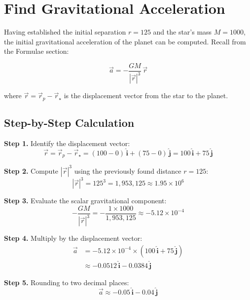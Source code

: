 \section{Find Gravitational Acceleration}

Having established the initial separation $r = 125$ and the star's mass $M = 1000$, the initial gravitational acceleration of the planet can be computed. Recall from the Formulae section:

\begin{equation}
\vec{a} = -\frac{GM}{|\vec{r}|^3}\,\vec{r}
\end{equation}

where $\vec{r} = \vec{r}_p - \vec{r}_\star$ is the displacement vector from the star to the planet.

\subsection{Step-by-Step Calculation}

\textbf{Step 1.} Identify the displacement vector:
\begin{equation}
\vec{r} = \vec{r}_p - \vec{r}_\star = (100 - 0)\,\hat{\mathbf{i}} + (75 - 0)\,\hat{\mathbf{j}} = 100\,\hat{\mathbf{i}} + 75\,\hat{\mathbf{j}}
\end{equation}

\textbf{Step 2.} Compute $|\vec{r}|^3$ using the previously found distance $r = 125$:
\begin{equation}
|\vec{r}|^3 = 125^3 = 1{,}953{,}125 \approx 1.95 \times 10^6
\end{equation}

\textbf{Step 3.} Evaluate the scalar gravitational component:
\begin{equation}
-\frac{GM}{|\vec{r}|^3} = -\frac{1 \times 1000}{1{,}953{,}125} \approx -5.12 \times 10^{-4}
\end{equation}

\textbf{Step 4.} Multiply by the displacement vector:
\begin{align}
\vec{a} &= -5.12 \times 10^{-4} \times (100\,\hat{\mathbf{i}} + 75\,\hat{\mathbf{j}}) \\
        &\approx -0.0512\,\hat{\mathbf{i}} - 0.0384\,\hat{\mathbf{j}}
\end{align}

\textbf{Step 5.} Rounding to two decimal places:
\begin{equation}
\vec{a} \approx -0.05\,\hat{\mathbf{i}} - 0.04\,\hat{\mathbf{j}}
\end{equation}

